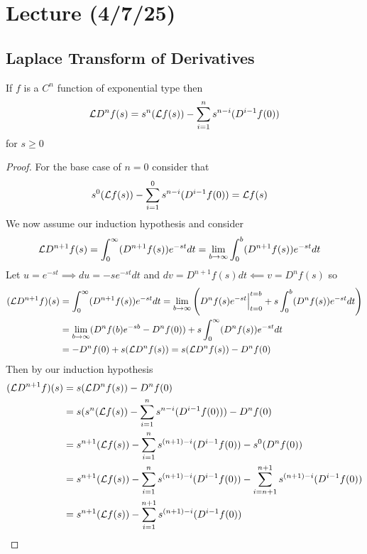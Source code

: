 \documentclass[notes]{subfiles}
\begin{document}
\setcounter{section}{18}
\section{Lecture (4/7/25)}

\subsection{Laplace Transform of Derivatives}
\begin{theorem}
    If $f$ is a $C^n$ function of exponential type then
    \[
        \mathcal{L} D^n f(s) = s^n(\mathcal{L} f(s)) - \sum_{i = 1}^n s^{n - i}(D^{i - 1}f(0))
    \]
    for $s \geq 0$
\end{theorem}
\begin{proof}
    For the base case of $n = 0$ consider that
    \begin{align*}
        s^0(\mathcal{L} f(s)) - \sum_{i = 1}^0 s^{n - i}(D^{i - 1}f(0))
        &= \mathcal{L} f(s)
    \end{align*}
    We now assume our induction hypothesis and consider
    \begin{align*}
        \mathcal{L} D^{n + 1} f(s)
        &= \int_0^\infty (D^{n + 1}f(s))e^{-st}dt
        = \lim_{b\to\infty} \int_0^b (D^{n + 1}f(s))e^{-st}dt
    \end{align*}
    Let $u = e^{-st} \implies du = -se^{-st}dt$ and $dv = D^{n + 1}f(s)dt \impliedby v = D^n f(s)$ so
    \begin{align*}
        (\mathcal{L} D^{n + 1} f)(s)
        &= \int_0^\infty (D^{n + 1}f(s))e^{-st}dt
        = \lim_{b\to\infty} \left( D^n f(s)e^{-st}\Big|_{t = 0}^{t = b} + s\int_0^b (D^n f(s))e^{-st}dt \right) \\
        &= \lim_{b\to\infty} (D^n f(b)e^{-sb} - D^n f(0)) + s\int_0^\infty (D^n f(s))e^{-st}dt \\
        &= -D^n f(0) + s(\mathcal{L} D^n f(s))
        = s(\mathcal{L} D^n f(s)) - D^n f(0)
    \end{align*}
    Then by our induction hypothesis
    \begin{align*}
        (\mathcal{L} D^{n + 1} f)(s)
        &= s(\mathcal{L} D^n f(s)) - D^n f(0) \\
        &= s(s^n(\mathcal{L} f(s)) - \sum_{i = 1}^n s^{n - i}(D^{i - 1}f(0))) - D^n f(0) \\
        &= s^{n + 1}(\mathcal{L} f(s)) - \sum_{i = 1}^n s^{(n + 1) - i}(D^{i - 1}f(0)) - s^0 (D^n f(0)) \\
        &= s^{n + 1}(\mathcal{L} f(s)) - \sum_{i = 1}^n s^{(n + 1) - i}(D^{i - 1}f(0)) - \sum_{i = n + 1}^{n + 1} s^{(n + 1) - i}(D^{i - 1}f(0)) \\
        &= s^{n + 1}(\mathcal{L} f(s)) - \sum_{i = 1}^{n + 1} s^{(n + 1) - i}(D^{i - 1}f(0))
    \end{align*}
\end{proof}
\end{document}
